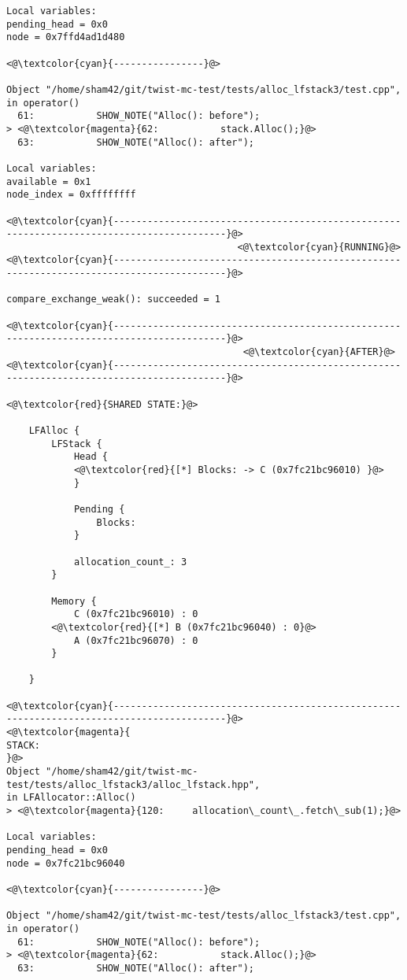 \begin{adjustwidth}{-3.3cm}{-1cm}
\begin{allintypewriter}
\begin{multicols*}{2}
\begin{lstlisting}[numbers=none]
Local variables: 
pending_head = 0x0
node = 0x7ffd4ad1d480

<@\textcolor{cyan}{----------------}@>

Object "/home/sham42/git/twist-mc-test/tests/alloc_lfstack3/test.cpp",
in operator()
  61:           SHOW_NOTE("Alloc(): before");
> <@\textcolor{magenta}{62:           stack.Alloc();}@>
  63:           SHOW_NOTE("Alloc(): after");

Local variables: 
available = 0x1
node_index = 0xffffffff

<@\textcolor{cyan}{------------------------------------------------------------------------------------------}@>
                                         <@\textcolor{cyan}{RUNNING}@>
<@\textcolor{cyan}{------------------------------------------------------------------------------------------}@>

compare_exchange_weak(): succeeded = 1

<@\textcolor{cyan}{------------------------------------------------------------------------------------------}@>
                                          <@\textcolor{cyan}{AFTER}@>
<@\textcolor{cyan}{------------------------------------------------------------------------------------------}@>

<@\textcolor{red}{SHARED STATE:}@>

    LFAlloc {
	    LFStack {
		    Head {
			<@\textcolor{red}{[*] Blocks: -> C (0x7fc21bc96010) }@>
		    }

		    Pending {
			    Blocks: 
		    }

		    allocation_count_: 3
	    }

	    Memory {
		    C (0x7fc21bc96010) : 0
		<@\textcolor{red}{[*] B (0x7fc21bc96040) : 0}@>
		    A (0x7fc21bc96070) : 0
	    }

    }

<@\textcolor{cyan}{------------------------------------------------------------------------------------------}@>
<@\textcolor{magenta}{
STACK:
}@>
Object "/home/sham42/git/twist-mc-test/tests/alloc_lfstack3/alloc_lfstack.hpp",
in LFAllocator::Alloc()
> <@\textcolor{magenta}{120:     allocation\_count\_.fetch\_sub(1);}@>

Local variables: 
pending_head = 0x0
node = 0x7fc21bc96040

<@\textcolor{cyan}{----------------}@>

Object "/home/sham42/git/twist-mc-test/tests/alloc_lfstack3/test.cpp",
in operator()
  61:           SHOW_NOTE("Alloc(): before");
> <@\textcolor{magenta}{62:           stack.Alloc();}@>
  63:           SHOW_NOTE("Alloc(): after");


\end{lstlisting}
\end{multicols*}
\end{allintypewriter}
\end{adjustwidth}

